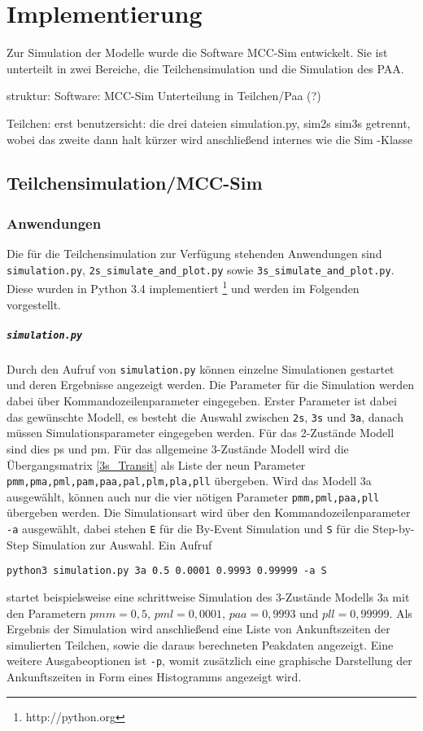 \chapter{Implementierung}
\label{chapter:imp}

Zur Simulation der Modelle wurde die Software MCC-Sim entwickelt. 
Sie ist unterteilt in zwei Bereiche, die Teilchensimulation und die Simulation des PAA.

struktur:
Software: MCC-Sim 
Unterteilung in Teilchen/Paa (?)

Teilchen: erst benutzersicht:
die drei dateien simulation.py, sim2s sim3s getrennt, wobei das zweite dann halt kürzer wird
anschließend internes wie die Sim -Klasse


\section{Teilchensimulation/MCC-Sim}


\subsection{Anwendungen}
Die für die Teilchensimulation zur Verfügung stehenden Anwendungen sind \texttt{simulation.py}, \verb!2s_simulate_and_plot.py! sowie  \verb!3s_simulate_and_plot.py!. Diese wurden in Python 3.4 implementiert \footnote{http://python.org} und werden im Folgenden vorgestellt.

\paragraph{\texttt{simulation.py}}

Durch den Aufruf von \texttt{simulation.py} können einzelne Simulationen gestartet und deren Ergebnisse angezeigt werden.
Die Parameter für die Simulation werden dabei über Kommandozeilenparameter eingegeben. Erster Parameter ist dabei das gewünschte Modell, es besteht die Auswahl zwischen \texttt{2s}, \texttt{3s} und \texttt{3a}, danach müssen Simulationsparameter eingegeben werden. Für das 2-Zustände Modell sind dies ps und pm. Für das allgemeine 3-Zustände Modell wird die Übergangsmatrix \ref{3s_Transit} als Liste der neun Parameter \verb!pmm,pma,pml,pam,paa,pal,plm,pla,pll! übergeben. Wird das Modell 3a ausgewählt, können auch nur die vier nötigen Parameter \verb!pmm,pml,paa,pll! übergeben werden.
Die Simulationsart wird über den Kommandozeilenparameter \texttt{-a} ausgewählt, dabei stehen \texttt{E} für die By-Event Simulation und \texttt{S} für die Step-by-Step Simulation zur Auswahl.
Ein Aufruf
\begin{verbatim}
python3 simulation.py 3a 0.5 0.0001 0.9993 0.99999 -a S
\end{verbatim}
startet beispielsweise eine schrittweise Simulation des 3-Zustände Modells 3a mit den Parametern $pmm = 0,5$, $pml = 0,0001$, $paa = 0,9993$ und $pll = 0,99999$. Als Ergebnis der Simulation wird anschließend eine Liste von Ankunftszeiten der simulierten Teilchen, sowie die daraus berechneten Peakdaten angezeigt. Eine weitere Ausgabeoptionen ist \texttt{-p}, womit zusätzlich eine graphische Darstellung der Ankunftszeiten in Form eines Histogramms angezeigt wird.

